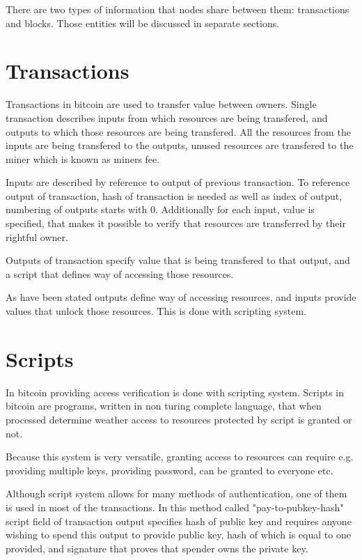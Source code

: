 \documentclass[12pt, en, eng, oneside]{mgr}
\begin{document}
There are two types of information that nodes share between them: transactions and blocks. \cite{bitcoin-paper-1} Those entities will be discussed in separate sections.

\section{Transactions}
Transactions in bitcoin are used to transfer value between owners. Single transaction describes inputs from which resources are being transfered, and outputs to which those resources are being transfered. All the resources from the inputs are being transfered to the outputs, unused resources are transfered to the miner which is known as miners fee.

Inputs are described by reference to output of previous transaction. To reference output of transaction, hash of transaction is needed as well as index of output, numbering of outputs starts with 0. Additionally for each input, value is specified, that makes it possible to verify that resources are transferred by their rightful owner.

Outputs of transaction specify value that is being transfered to that output, and a script that defines way of accessing those resources.

As have been stated outputs define way of accessing resources, and inputs provide values that unlock those resources. This is done with scripting system.

\section{Scripts}
In bitcoin providing access verification is done with scripting system. Scripts in bitcoin are programs, written in non turing complete language, that when processed determine weather access to resources protected by script is granted or not.

Because this system is very versatile, granting access to resources can require e.g. providing multiple keys, providing password, can be granted to everyone etc. 

Although script system allows for many methods of authentication, one of them is used in most of the transactions. In this method called "pay-to-pubkey-hash" script field of transaction output specifies hash of public key and requires anyone wishing to spend this output to provide public key, hash of which is equal to one provided, and signature that proves that spender owns the private key.
\end{document}
